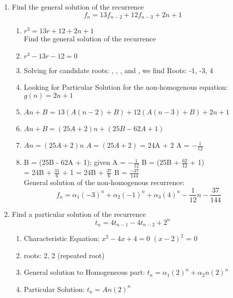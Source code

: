 \documentclass[11pt]{article}
\newcounter{prnum}
\newenvironment{problem}{{\vskip 0.2in\noindent\bf Problem
       \addtocounter{prnum}{1} \arabic{prnum}.}}{\vskip 0.1in}
\begin{document}

\begin{problem} 
\begin{enumerate}[label=\alph*)]
  \item  Find the general solution of the recurrence
    \begin{equation*}
      f_n = 13f_{n-2} + 12f_{n-3} + 2n + 1
    \end{equation*}
    \begin{enumerate}
      \item $r^3 = 13r + 12 + 2n + 1$\\

        Find the general solution of the recurrence
      \item $r^3 - 13r - 12 = 0$
      \item Solving for candidate roots: , , , and ,
        we find Roots: -1, -3, 4
      \item Looking for Particular Solution for the non-homogenous equation: $g(n) = 2n + 1$
      \item $An + B$ = $13(A(n-2) + B) + 12(A(n-3) + B) + 2n + 1$
      \item $An + B = (25A + 2)n + (25B - 62A + 1)$
      \item \Rightarrow $An = (25A + 2)n$ \Rightarrow $A = (25A + 2)$  = 24A + 2
       \Rightarrow A = $-\frac{1}{12}$
      \item \Rightarrow B = (25B - 62A + 1); given A = $-\frac{1}{12}$ \Rightarrow B = (25B + $\frac{62}{12}$ + 1)  \\

         = 24B + $\frac{31}{6}$ + 1  = 24B + $\frac{37}{6}$ \Rightarrow B = $\frac{-37}{144}$\\

        General solution of the non-homogenous recurrence:
        \begin{equation}
          f_n = \alpha_1(-3)^n + \alpha_2(-1)^n + \alpha_3(4)^n - \frac{1}{12}n - \frac{37}{144}
        \end{equation}

    \end{enumerate}

    \pagebreak
  \item Find a particular solution of the recurrence
    \begin{equation*}
      t_n = 4t_{n-1} - 4t_{n-2} + 2^{n}
    \end{equation*}
    \begin{enumerate}
      \item Characteristic Equation: $x^2 - 4x +4 = 0$ \Rightarrow $(x-2)^2$ = 0
      \item roots: 2, 2 (repeated root)
      \item General solution to Homogeneous part: $t_n = \alpha_1(2)^n + \alpha_2n(2)^n$
      \item Particular Solution: $t_n = An(2)^n$\\


\end{enumerate}
\end{enumerate}
\end{problem}
\end{document}
